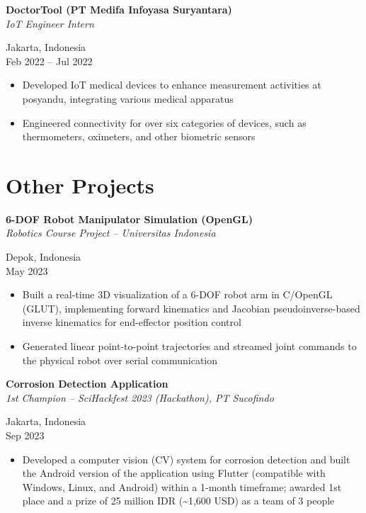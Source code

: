 \documentclass[a4paper,10pt]{article}
\begin{document}
\noindent
\begin{minipage}[t]{0.68\textwidth}
    \textbf{DoctorTool (PT Medifa Infoyasa Suryantara)} \\
    \textit{IoT Engineer Intern}
\end{minipage}%
\begin{minipage}[t]{0.32\textwidth}
    \raggedleft
    Jakarta, Indonesia \\
    Feb 2022 -- Jul 2022
\end{minipage}
\begin{itemize}[leftmargin=*, noitemsep]
    \item Developed IoT medical devices to enhance measurement activities at posyandu, integrating various medical apparatus
    \item Engineered connectivity for over six categories of devices, such as thermometers, oximeters, and other biometric sensors
\end{itemize}

\section*{Other Projects}

\noindent
\begin{minipage}[t]{0.68\textwidth}
    \textbf{6-DOF Robot Manipulator Simulation (OpenGL)} \\
    \textit{Robotics Course Project -- Universitas Indonesia}
\end{minipage}%
\begin{minipage}[t]{0.32\textwidth}
    \raggedleft
    Depok, Indonesia \\
    May 2023
\end{minipage}
\begin{itemize}[leftmargin=*, noitemsep]
    \item Built a real-time 3D visualization of a 6-DOF robot arm in C/OpenGL (GLUT), implementing forward kinematics and Jacobian pseudoinverse-based inverse kinematics for end-effector position control
    \item Generated linear point-to-point trajectories and streamed joint commands to the physical robot over serial communication
\end{itemize}

\noindent
\begin{minipage}[t]{0.68\textwidth}
    \textbf{Corrosion Detection Application} \\
    \textit{1st Champion -- SciHackfest 2023 (Hackathon), PT Sucofindo}
\end{minipage}%
\begin{minipage}[t]{0.32\textwidth}
    \raggedleft
    Jakarta, Indonesia \\
    Sep 2023
\end{minipage}
\begin{itemize}[leftmargin=*, noitemsep]
    \item Developed a computer vision (CV) system for corrosion detection and built the Android version of the application using Flutter (compatible with Windows, Linux, and Android) within a 1-month timeframe; awarded 1st place and a prize of 25 million IDR (\textasciitilde{}1,600 USD) as a team of 3 people
\end{itemize}
\end{document}
